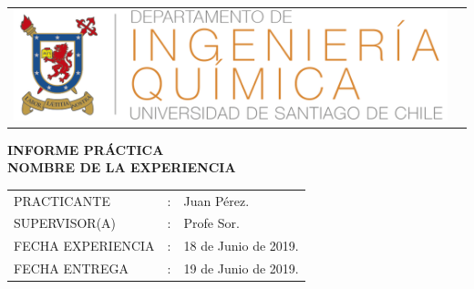 \begin{titlepage}

\begin{flushleft}
    \begin{tabular}{ll} %
      \multirow{4}{2cm}{\includegraphics[height=0.1\textheight]{imagenes/logo_quimica_trans.png} }%
    \end{tabular}
\end{flushleft}

\vspace*{\fill}%
\begin{center}
\textbf{INFORME PRÁCTICA}\\ %
\textbf{NOMBRE DE LA EXPERIENCIA} 
\end{center}
\vspace*{\fill}%
   
\begin{flushright}
   \begin{tabular}{lll}
   PRACTICANTE &:& Juan Pérez.\\
   SUPERVISOR(A)    &:& Profe Sor.\\
   FECHA EXPERIENCIA &:& 18 de Junio de 2019.\\
   FECHA ENTREGA     &:& 19 de Junio de 2019.\\
   \end{tabular}
\end{flushright}
\end{titlepage}